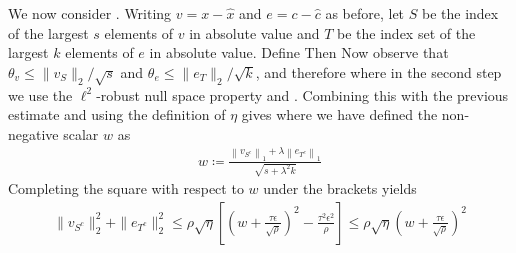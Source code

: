 \documentclass[10.5pt]{article}
\begin{document}
{We now consider .  Writing $v = x - \hat{x}$ and $e = c - \hat{c}$ as before, let $S$ be the index of the largest $s$ elements of $v$ in absolute value and $T$ be the index set of the largest $k$ elements of $e$ in absolute value.  Define
Then
Now observe that $\theta_{v} \leq \| v_{S} \|_{2} / \sqrt{s}$ and $\theta_{e} \leq \| e_{T} \|_{2} / \sqrt{k}$, and therefore
where in the second step we use the $\ell^2$-robust null space property and .  Combining this with the previous estimate and using the definition of $\eta$ gives
where we have defined the non-negative scalar $w$ as
  \begin{align*}
    w \coloneqq \frac{\left\| v_{S^c} \right\|_1 + \lambda \left\| e_{T^c} \right\|_1}{\sqrt{s + \lambda^2 k}}
  \end{align*}
  Completing the square with respect to $w$ under the brackets yields
  \begin{align*}
    \| v_{S^c} \|^2_{2} + \| e_{T^c} \|^2_2 \leq \rho \sqrt{\eta} \left[ \left(w + \frac{\tau \epsilon}{\sqrt{\rho}} \right)^2 - \frac{\tau^2 \epsilon^2}{\rho} \right] 
                                            \leq \rho \sqrt{\eta} \left(w + \frac{\tau \epsilon}{\sqrt{\rho}}\right)^2
  \end{align*}
}
\end{document}
